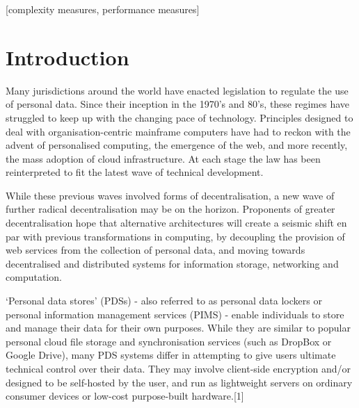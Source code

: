 \documentclass{acm_proc_article-sp}
\begin{document}
[complexity measures, performance measures]



\section{Introduction}

Many jurisdictions around the world have enacted legislation to regulate the use of personal data. Since their inception in the 1970's and 80's, these regimes have struggled to keep up with the changing pace of technology. Principles designed to deal with organisation-centric mainframe computers have had to reckon with the advent of personalised computing, the emergence of the web, and more recently, the mass adoption of cloud infrastructure. At each stage the law has been reinterpreted to fit the latest wave of technical development.
 
While these previous waves involved forms of decentralisation, a new wave of further radical decentralisation may be on the horizon. Proponents of greater decentralisation hope that alternative architectures will create a seismic shift en par with previous transformations in computing, by decoupling the provision of web services from the collection of personal data, and moving towards decentralised and distributed systems for information storage, networking and computation.


 
‘Personal data stores’ (PDSs) - also referred to as personal data lockers or personal information management services (PIMS) - enable individuals to store and manage their data for their own purposes. While they are similar to popular personal cloud file storage and synchronisation services (such as DropBox or Google Drive), many PDS systems differ in attempting to give users ultimate technical control over their data. They may involve client-side encryption and/or designed to be self-hosted by the user, and run as lightweight servers on ordinary consumer devices or low-cost purpose-built hardware.[1]
 
\end{document}

